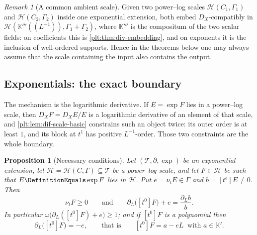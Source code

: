 \documentclass[11pt,oneside]{article}
\theoremstyle{plain}
\newtheorem{proposition}[theorem]{Proposition}
\theoremstyle{definition}
\theoremstyle{remark}
\newtheorem{remark}[theorem]{Remark}
\newcommand{\K}{\mathbb{K}}
\newcommand{\ordt}{\nu_{t}}                              %
\newcommand{\DX}{D_{X}}                                  %
\begin{document}
\begin{remark}[A common ambient scale]\label{plt:rmk:dif-common-scale}
Given two power--log scales \(\mathcal H(C_{1},\Gamma_{1})\) and
\(\mathcal H(C_{2},\Gamma_{2})\) inside one exponential extension, both embed
\(\DX\)-compatibly in \(\mathcal H(\K'''((L^{-1})),\Gamma_{1}+\Gamma_{2})\),
where \(\K'''\) is the compositum of the two scalar fields: on coefficients this
is \cref{plt:thm:div-embedding}, and on exponents it is the inclusion of
well-ordered supports.  Hence in the theorems below one may always assume that
the scale containing the input also contains the output.
\end{remark}

\subsection{Exponentials: the exact boundary}
\label{plt:sec:dif-exponential}

The mechanism is the logarithmic derivative.  If \(E=\exp F\) lies in a
power--log scale, then \(\DX F=\DX E/E\) is a logarithmic derivative of an
element of that scale, and \cref{plt:lem:dif-scale-basic} constrains such an
object twice: its outer order is at least \(1\), and its block at \(t^{1}\) has
positive \(L^{-1}\)-order.  Those two constraints are the whole boundary.

\begin{proposition}[Necessary conditions]\label{plt:prop:dif-exp-necessary}
Let \((\mathcal T,\partial,\exp)\) be an exponential extension, let
\(\mathcal H=\mathcal H(C,\Gamma)\subseteq\mathcal T\) be a power--log scale,
and let \(F\in\mathcal H\) be such that \(E\DefinitionEquals\exp F\) lies in
\(\mathcal H\).  Put \(e=\ordt E\in\Gamma\) and \(b=[t^{e}]E\ne0\).  Then
\begin{equation}\label{plt:eq:dif-exp-necessity}
  \ordt F\ge0
  \qquad\text{and}\qquad
  \partial_{L}\bigl([t^{0}]F\bigr)+e=\frac{\partial_{L}b}{b} .
\end{equation}
In particular \(\omega\bigl(\partial_{L}([t^{0}]F)+e\bigr)\ge1\); and if
\([t^{0}]F\) is a polynomial then
\begin{equation}\label{plt:eq:dif-exp-affine}
  \partial_{L}\bigl([t^{0}]F\bigr)=-e,
  \qquad\text{that is}\qquad
  [t^{0}]F=a-eL\ \text{ with }a\in\K' .
\end{equation}
\end{proposition}
\end{document}
